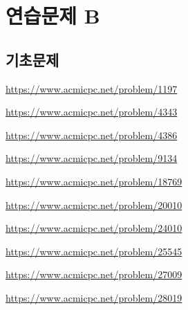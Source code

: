 \section{연습문제 B}

\subsection{기초문제}
\begin{problem} \url{https://www.acmicpc.net/problem/1197} \end{problem}
\begin{problem} \url{https://www.acmicpc.net/problem/4343} \end{problem}
\begin{problem} \url{https://www.acmicpc.net/problem/4386} \end{problem}
\begin{problem} \url{https://www.acmicpc.net/problem/9134} \end{problem}
\begin{problem} \url{https://www.acmicpc.net/problem/18769} \end{problem}
\begin{problem} \url{https://www.acmicpc.net/problem/20010} \end{problem}
\begin{problem} \url{https://www.acmicpc.net/problem/24010} \end{problem}
\begin{problem} \url{https://www.acmicpc.net/problem/25545} \end{problem}
\begin{problem} \url{https://www.acmicpc.net/problem/27009} \end{problem}
\begin{problem} \url{https://www.acmicpc.net/problem/28019} \end{problem}

